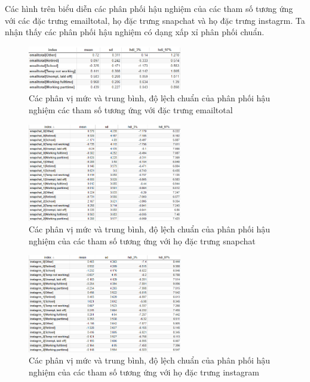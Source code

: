 Các hình trên biểu diễn các phân phối hậu nghiệm của các tham số tương ứng với các đặc trưng emailtotal, họ đặc trưng snapchat và họ đặc trưng instagrm.
Ta nhận thấy các phân phối hậu nghiệm có dạng xấp xỉ phân phối chuẩn.

\begin{figure}[H]
    \centering
    \includegraphics[width=0.6\textwidth]{figures/Thanh/Models/Bayesian_Multi_Logit/Bayesian_email_non_null_emailtotal_weights.png}
    \caption{Các phân vị mức và trung bình, độ lệch chuẩn của phân phối hậu nghiệm các tham số tương ứng với đặc trưng emailtotal}
    \label{fig:Bayesian_email_non_null_emailtotal_weights}
\end{figure}

\begin{figure}[H]
    \centering
    \includegraphics[width=0.6\textwidth]{figures/Thanh/Models/Bayesian_Multi_Logit/Bayesian_email_with_null_snapchat_weights.png}
    \caption{Các phân vị mức và trung bình, độ lệch chuẩn của phân phối hậu nghiệm của các tham số tương ứng với họ đặc trưng snapchat}
    \label{fig:Bayesian_email_with_null_snapchat_weights}
\end{figure}


\begin{figure}[H]
    \centering
    \includegraphics[width=0.6\textwidth]{figures/Thanh/Models/Bayesian_Multi_Logit/Bayesian_email_with_null_instagrm_weights.png}
    \caption{Các phân vị mức và trung bình, độ lệch chuẩn của phân phối hậu nghiệm của các tham số tương ứng với họ đặc trưng instagram}
    \label{fig:Bayesian_email_with_null_instagrm_weights}
\end{figure}

